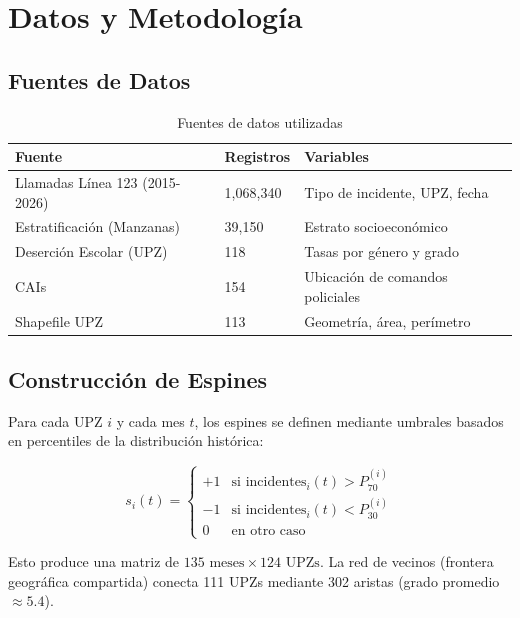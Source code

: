 \documentclass[12pt,a4paper]{article}
\begin{document}
\section{Datos y Metodología}

\subsection{Fuentes de Datos}

\begin{table}[H]
\centering
\caption{Fuentes de datos utilizadas}
\label{tab:fuentes}
\begin{tabular}{@{}lll@{}}
\toprule
\textbf{Fuente} & \textbf{Registros} & \textbf{Variables} \\
\midrule
Llamadas Línea 123 (2015-2026) & 1,068,340 & Tipo de incidente, UPZ, fecha \\
Estratificación (Manzanas) & 39,150 & Estrato socioeconómico \\
Deserción Escolar (UPZ) & 118 & Tasas por género y grado \\
CAIs & 154 & Ubicación de comandos policiales \\
Shapefile UPZ & 113 & Geometría, área, perímetro \\
\bottomrule
\end{tabular}
\end{table}

\subsection{Construcción de Espines}

Para cada UPZ $i$ y cada mes $t$, los espines se definen mediante umbrales basados en percentiles de la distribución histórica:

\begin{equation}\label{eq:espines}
s_i(t) = \begin{cases}
+1 & \text{si } \text{incidentes}_i(t) > P_{70}^{(i)} \\
-1 & \text{si } \text{incidentes}_i(t) < P_{30}^{(i)} \\
0  & \text{en otro caso}
\end{cases}
\end{equation}

Esto produce una matriz de $135 \text{ meses} \times 124 \text{ UPZs}$. La red de vecinos (frontera geográfica compartida) conecta 111 UPZs mediante 302 aristas (grado promedio $\approx 5.4$).
\end{document}

